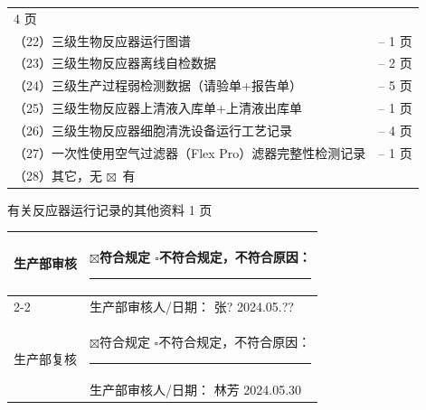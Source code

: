 \documentclass[UTF8,10pt,a4paper,fontset=fandol]{ctexart}
\newcommand{\fieldvalue}[1]{#1}
\newcommand{\handwritten}[1]{#1}
\begin{document}
\begin{tabular}{@{}p{}r@{}}
\fieldvalue{\handwritten{4}} 页
\\
（22）三级生物反应器运行图谱 &
--\quad
\fieldvalue{\handwritten{1}} 页
\\
（23）三级生物反应器离线自检数据 &
--\quad
\fieldvalue{\handwritten{2}} 页
\\
（24）三级生产过程弱检测数据（请验单+报告单） &
--\quad
\fieldvalue{\handwritten{5}} 页
\\
（25）三级生物反应器上清液入库单+上清液出库单 &
--\quad
\fieldvalue{\handwritten{1}} 页
\\
（26）三级生物反应器细胞清洗设备运行工艺记录 &
--\quad
\fieldvalue{\handwritten{4}} 页
\\
（27）一次性使用空气过滤器（Flex Pro）滤器完整性检测记录 &
--\quad
\fieldvalue{\handwritten{1}} 页
\\
（28）其它，无\quad
\fieldvalue{\ensuremath{\boxtimes}}\ 有 &
\end{tabular}

\handwritten{有关反应器运行记录的其他资料}
\quad
\fieldvalue{\handwritten{1}} 页

\vspace{8pt}

\begin{tabular}{|p{1.1cm}|p{10.2cm}|}
\hline
\multirow{2}{*}{生产部审核} &
\fieldvalue{\ensuremath{\boxtimes}}符合规定\quad
$\square$不符合规定，不符合原因：\rule{4cm}{0.4pt}
\\ \cline{2-2}
&
生产部审核人/日期：
\fieldvalue{\handwritten{张?}}
\quad
\fieldvalue{\handwritten{2024.05.??}}
\\ \hline
\multirow{2}{*}{生产部复核} &
\fieldvalue{\ensuremath{\boxtimes}}符合规定\quad
$\square$不符合规定，不符合原因：\rule{4cm}{0.4pt}
\\ \cline{2-2}
&
生产部审核人/日期：
\fieldvalue{\handwritten{林芳}}
\quad
\fieldvalue{\handwritten{2024.05.30}}
\\ \hline
\end{tabular}
\end{document}
